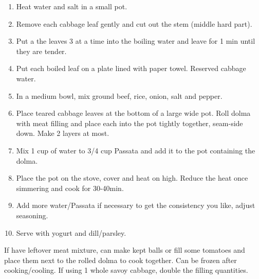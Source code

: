 \begin{enumerate}
    \item Heat water and salt in a small pot.
    \item Remove each cabbage leaf gently and cut out the stem (middle hard part).
    \item Put a the leaves 3 at a time into the boiling water and leave for 1 min until they are tender.
    \item Put each boiled leaf on a plate lined with paper towel. Reserved cabbage water.
    \item In a medium bowl, mix ground beef, rice, onion, salt and pepper.
    \item Place teared cabbage leaves at the bottom of a large wide pot. Roll dolma with meat filling and place each into the pot tightly together, seam-side down. Make 2 layers at most.
    \item Mix 1 cup of water to 3/4 cup Passata and add it to the pot containing the dolma.
    \item Place the pot on the stove, cover and heat on high. Reduce the heat once simmering and cook for 30-40min.
    \item Add more water/Passata if necessary to get the consistency you like, adjust seasoning.
    \item Serve with yogurt and dill/parsley.
\end{enumerate}

If have leftover meat mixture, can make kept balls or fill some tomatoes and place them next to the rolled dolma to cook together.
Can be frozen after cooking/cooling.
If using 1 whole savoy cabbage, double the filling quantities.
